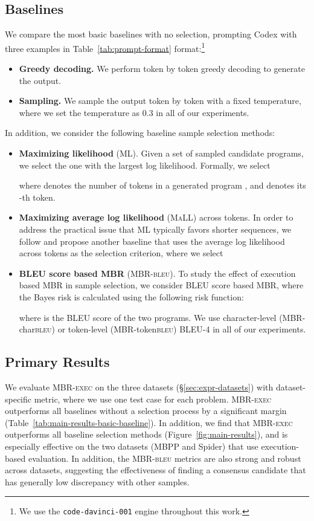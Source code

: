 \documentclass[11pt]{article}
\newcommand{\mbrexec}{\textsc{MBR-exec}\xspace}
\newcommand{\mbrbleu}{\textsc{MBR-bleu}\xspace}
\newcommand{\maxlikelihood}{ML\xspace}
\newcommand{\maxavglikelihood}{\textsc{MaLL}\xspace}
\begin{document}
 \subsection{Baselines}
\label{sec:expr-baselines}
We compare the most basic baselines with no selection, prompting Codex with three examples in Table~\ref{tab:prompt-format} format:\footnote{We use the \texttt{code-davinci-001} engine throughout this work.}
\begin{itemize}[leftmargin=*]\setlength{\itemsep}{0pt}
    \item \textbf{Greedy decoding.} We perform token by token greedy decoding to generate the output. 
    \item \textbf{Sampling.} We sample the output token by token with a fixed temperature, where we set the temperature as 0.3 in all of our experiments. 
\end{itemize}
In addition, we consider the following baseline sample selection methods:
\begin{itemize}[leftmargin=*]\setlength{\itemsep}{0pt}
    \item \textbf{Maximizing likelihood} (\maxlikelihood). Given a set of sampled candidate programs, we select the one with the largest log likelihood. Formally, we select 
    
    where  denotes the number of tokens in a generated program , and  denotes its -th token.
    \item \textbf{Maximizing average log likelihood} (\maxavglikelihood) across tokens. In order to address the practical issue that ML typically favors shorter sequences, we follow \citet{chen2021evaluating} and propose another baseline that uses the average log likelihood across tokens as the selection criterion, where we select 
    
    \item \textbf{BLEU score based MBR} (\mbrbleu). To study the effect of execution based MBR in sample selection, we consider BLEU score based MBR, where the Bayes risk is calculated using the following risk function:
    
    where  is the BLEU score of the two programs. We use character-level (MBR-char\textsc{bleu}) or token-level (MBR-token\textsc{bleu}) BLEU-4 in all of our experiments.
\end{itemize}
 \subsection{Primary Results}
\label{sec:expr-results-main}
We evaluate \mbrexec on the three datasets (\S\ref{sec:expr-datasets}) with dataset-specific metric, where we use one test case for each problem. 
\mbrexec outperforms all baselines without a selection process by a significant margin (Table~\ref{tab:main-results-basic-baseline}).
In addition, we find that \mbrexec outperforms all baseline selection methods (Figure~\ref{fig:main-results}), and is especially effective on the two datasets (MBPP and Spider) that use execution-based evaluation. In addition, the \mbrbleu metrics are also strong and robust across datasets, suggesting the effectiveness of finding a consensus candidate that has generally low discrepancy with other samples. 
\end{document}
